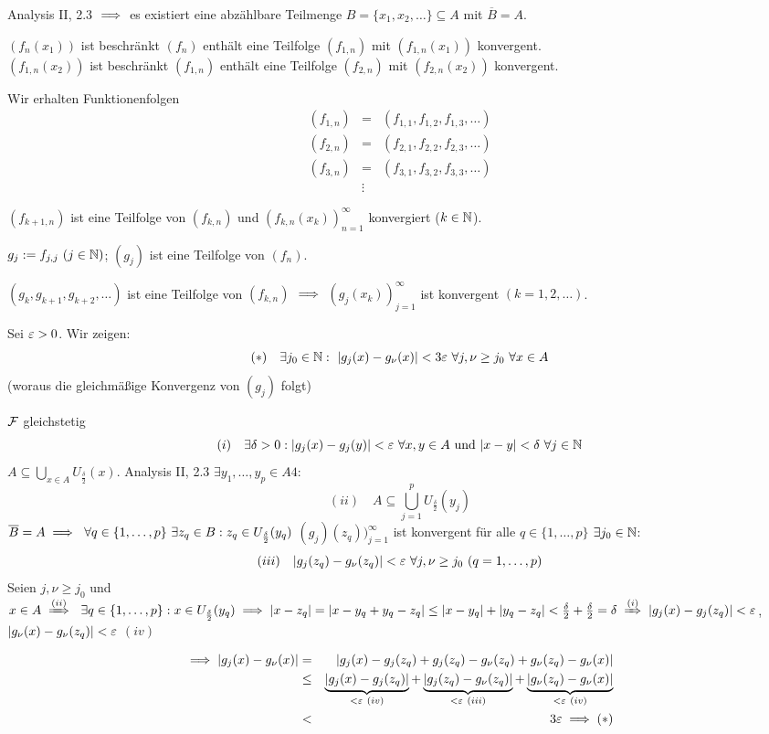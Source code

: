 \documentclass[a4paper,twoside,DIV15,BCOR12mm]{scrbook}
\begin{document}
\begin{beweis}
Analysis II, 2.3 $\implies$ es existiert eine abzählbare Teilmenge $B=\{x_1,x_2,\ldots\} \subseteq A$ mit $\overline{B} = A$.

$(f_n(x_1))$ ist beschränkt  $(f_n)$ enthält eine Teilfolge $(f_{1,n})$ mit $(f_{1,n}(x_1))$ konvergent.\\
$(f_{1,n}(x_2))$ ist beschränkt  $(f_{1,n})$ enthält eine Teilfolge $(f_{2,n})$ mit $(f_{2,n}(x_2))$ konvergent.

Wir erhalten Funktionenfolgen
\begin{eqnarray*}
(f_{1,n}) &=& (f_{1,1},f_{1,2},f_{1,3},\ldots)  \\
(f_{2,n}) &=& (f_{2,1},f_{2,2},f_{2,3},\ldots)  \\
(f_{3,n}) &=& (f_{3,1},f_{3,2},f_{3,3},\ldots)   \\
& \vdots &
\end{eqnarray*}

$(f_{k+1,n})$ ist eine Teilfolge von $(f_{k,n})$ und $(f_{k,n}(x_k))_{n=1}^\infty$ konvergiert ($k\in\mathbb{N}$).

$g_j := f_{j,j}\ (j\in\mathbb{N})$; $(g_j)$ ist eine Teilfolge von $(f_n)$.

$(g_k, g_{k+1}, g_{k+2}, \ldots)$ ist eine Teilfolge von $(f_{k,n})$ $\implies$ $(g_j(x_k))_{j=1}^\infty$ ist konvergent $(k=1,2,\ldots)$.

Sei $\varepsilon > 0$. Wir zeigen: 
\[(*)\quad \exists j_0\in\mathbb{N}:\ |g_j(x) - g_\nu(x)| < 3\varepsilon \ \forall j,\nu \ge j_0\ \forall x\in A\] 
(woraus die gleichmäßige Konvergenz von $(g_j)$ folgt)

$\mathcal{F}$ gleichstetig \folgt 
\[ (i) \quad \exists \delta >0: |g_j(x)-g_j(y)| < \varepsilon \ \forall x,y\in A\text{ und }|x-y| <\delta\ \forall j\in\mathbb{N}\]
$A\subseteq \bigcup_{x\in A} U_{\frac\delta2}(x)$. Analysis II, 2.3 \folgt $\exists y_1,\ldots,y_p \in A4$:
\[ (ii) \quad A \subseteq \bigcup_{j=1}^p U_{\frac\delta2}(y_j) \]
$\overline{B} = A \implies \ \forall q\in\{1,\ldots,p\} \ \exists z_q \in B: z_q \in U_{\frac\delta2}(y_q)$
$(g_j)(z_q))_{j=1}^\infty$ ist konvergent für alle $q\in\{1,\ldots,p\}$ \folgt $\exists j_0\in\mathbb{N}$:
\[ (iii)\quad | g_j(z_q) - g_\nu(z_q) | < \ep \ \forall j,\nu \ge j_0 \ (q=1,\ldots,p)\]
Seien $j,\nu \ge j_0$ und $x\in A \folgtwegen{(ii)} \ \exists q\in\{1,\ldots,p\}: x\in U_{\frac\delta2}(y_q) \folgt |x-z_q| = |x-y_q+y_q-z_q| \le |x-y_q| + |y_q-z_q| < \frac{\delta}2 + \frac\delta2 = \delta \folgtwegen{(i)} |g_j(x) - g_j(z_q)| < \ep$, $|g_\nu (x) - g_\nu (z_q)|<\varepsilon$ $(iv)$

\begin{eqnarray*}
\implies |g_j(x)-g_\nu(x)| &=& |g_j(x)-g_j(z_q) + g_j(z_q) - g_\nu(z_q) + g_\nu(z_q)-g_\nu(x)| \\
&\le& \underbrace{|g_j(x) - g_j(z_q)|}_{< \varepsilon\ (iv)} + \underbrace{|g_j(z_q) - g_\nu(z_q)|}_{< \varepsilon\ (iii)} + \underbrace{|g_\nu(z_q) - g_\nu(x)|}_{< \varepsilon\ (iv)}\\
&<& 3 \varepsilon \implies (*)
\end{eqnarray*}
\
 
\end{beweis}
\end{document}
